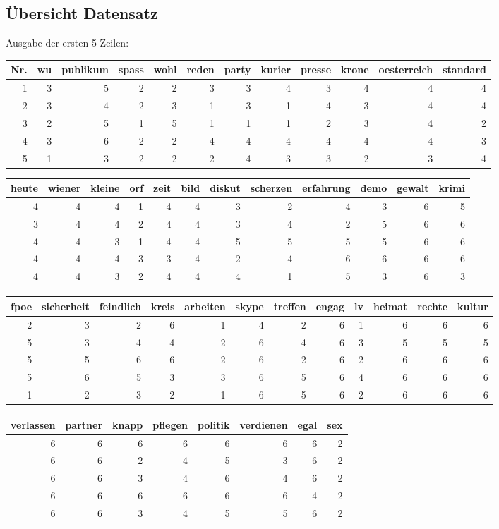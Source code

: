 \documentclass[]{article}
\begin{document}
\subsection{Übersicht Datensatz}\label{ubersicht-datensatz}

Ausgabe der ersten 5 Zeilen:

\begin{longtable}[]{@{}rrrrrrrrrrrr@{}}
\toprule
Nr. & wu & publikum & spass & wohl & reden & party & kurier & presse &
krone & oesterreich & standard\tabularnewline
\midrule
\endhead
1 & 3 & 5 & 2 & 2 & 3 & 3 & 4 & 3 & 4 & 4 & 4\tabularnewline
2 & 3 & 4 & 2 & 3 & 1 & 3 & 1 & 4 & 3 & 4 & 4\tabularnewline
3 & 2 & 5 & 1 & 5 & 1 & 1 & 1 & 2 & 3 & 4 & 2\tabularnewline
4 & 3 & 6 & 2 & 2 & 4 & 4 & 4 & 4 & 4 & 4 & 3\tabularnewline
5 & 1 & 3 & 2 & 2 & 2 & 4 & 3 & 3 & 2 & 3 & 4\tabularnewline
\bottomrule
\end{longtable}

\begin{longtable}[]{@{}rrrrrrrrrrrr@{}}
\toprule
heute & wiener & kleine & orf & zeit & bild & diskut & scherzen &
erfahrung & demo & gewalt & krimi\tabularnewline
\midrule
\endhead
4 & 4 & 4 & 1 & 4 & 4 & 3 & 2 & 4 & 3 & 6 & 5\tabularnewline
3 & 4 & 4 & 2 & 4 & 4 & 3 & 4 & 2 & 5 & 6 & 6\tabularnewline
4 & 4 & 3 & 1 & 4 & 4 & 5 & 5 & 5 & 5 & 6 & 6\tabularnewline
4 & 4 & 4 & 3 & 3 & 4 & 2 & 4 & 6 & 6 & 6 & 6\tabularnewline
4 & 4 & 3 & 2 & 4 & 4 & 4 & 1 & 5 & 3 & 6 & 3\tabularnewline
\bottomrule
\end{longtable}

\begin{longtable}[]{@{}rrrrrrrrrrrr@{}}
\toprule
fpoe & sicherheit & feindlich & kreis & arbeiten & skype & treffen &
engag & lv & heimat & rechte & kultur\tabularnewline
\midrule
\endhead
2 & 3 & 2 & 6 & 1 & 4 & 2 & 6 & 1 & 6 & 6 & 6\tabularnewline
5 & 3 & 4 & 4 & 2 & 6 & 4 & 6 & 3 & 5 & 5 & 5\tabularnewline
5 & 5 & 6 & 6 & 2 & 6 & 2 & 6 & 2 & 6 & 6 & 6\tabularnewline
5 & 6 & 5 & 3 & 3 & 6 & 5 & 6 & 4 & 6 & 6 & 6\tabularnewline
1 & 2 & 3 & 2 & 1 & 6 & 5 & 6 & 2 & 6 & 6 & 6\tabularnewline
\bottomrule
\end{longtable}

\begin{longtable}[]{@{}rrrrrrrr@{}}
\toprule
verlassen & partner & knapp & pflegen & politik & verdienen & egal &
sex\tabularnewline
\midrule
\endhead
6 & 6 & 6 & 6 & 6 & 6 & 6 & 2\tabularnewline
6 & 6 & 2 & 4 & 5 & 3 & 6 & 2\tabularnewline
6 & 6 & 3 & 4 & 6 & 4 & 6 & 2\tabularnewline
6 & 6 & 6 & 6 & 6 & 6 & 4 & 2\tabularnewline
6 & 6 & 3 & 4 & 5 & 5 & 6 & 2\tabularnewline
\bottomrule
\end{longtable}
\end{document}
